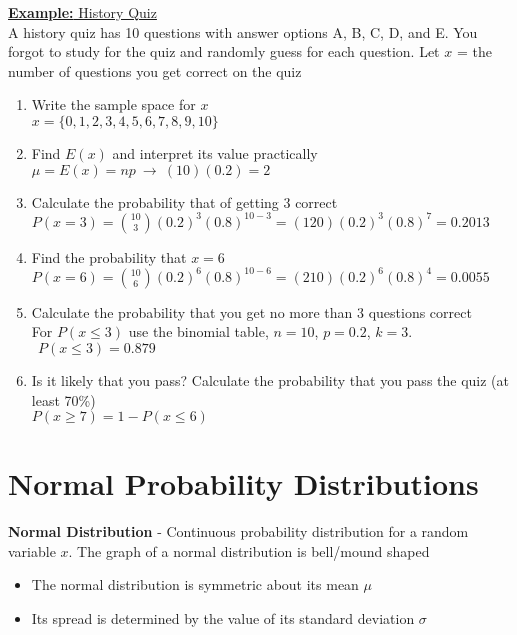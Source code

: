 \documentclass[a4paper]{article}
\let\bf\textbf
\begin{document}
\begin{shaded}
    \underline{\bf{Example:} History Quiz}
    \vspace{2mm}\\
    A history quiz has 10 questions with answer options A, B, C, D, and E. You forgot to study for the quiz and randomly guess for each question. Let $x$ = the number of questions you get correct on the quiz
    \begin{enumerate}
        \item Write the sample space for $x$\\
        $x = \{0, 1, 2, 3, 4, 5, 6, 7, 8, 9, 10\}$
        \item Find $E(x)$ and interpret its value practically\\
        $\mu = E(x) = np\ \to \ (10)(0.2) = 2$
        \item Calculate the probability that of getting 3 correct\\
        $P(x = 3) = \binom{10}{3}(0.2)^3(0.8)^{10 - 3} = (120)(0.2)^3(0.8)^7 = 0.2013$
        \item Find the probability that $x = 6$\\
        $P(x = 6) = \binom{10}{6}(0.2)^6(0.8)^{10 - 6} = (210)(0.2)^6(0.8)^4 = 0.0055$
        \item Calculate the probability that you get no more than 3 questions correct\\
        For $P(x \leq 3)$ use the binomial table, $n = 10$, $p = 0.2$, $k = 3$. $\ \ P(x \leq 3) = 0.879$
        \item Is it likely that you pass? Calculate the probability that you pass the quiz (at least 70\%)\\
        $P(x \geq 7) = 1 - P(x \leq 6)$
    \end{enumerate}
\end{shaded}

\newpage
\section{Normal Probability Distributions}
\bf{Normal Distribution} - Continuous probability distribution for a random variable $x$. The graph of a normal distribution is bell/mound shaped
\begin{itemize}
    \item The normal distribution is symmetric about its mean $\mu$
    \item Its spread is determined by the value of its standard deviation $\sigma$
\end{itemize}
\end{document}
